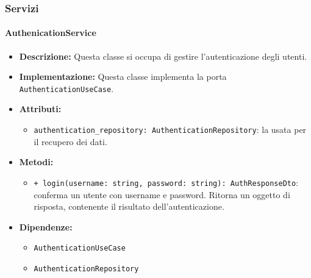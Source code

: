 \subsubsection{Servizi}

\paragraph{AuthenicationService} \label{AuthenticationService}
\begin{itemize}
    \item \textbf{Descrizione:} Questa classe si occupa di gestire l'autenticazione degli utenti.
    \item \textbf{Implementazione:} Questa classe implementa la porta \texttt{AuthenticationUseCase}.
    \item \textbf{Attributi:}
    \begin{itemize}
        \item \texttt{authentication\_repository: AuthenticationRepository}: la  usata per il recupero dei dati.
    \end{itemize}
    \item \textbf{Metodi:}
    \begin{itemize}
        \item \texttt{+ login(username: string, password: string): AuthResponseDto}: conferma un utente con username e password. Ritorna un oggetto di risposta, contenente il risultato dell'autenticazione.
    \end{itemize}
    \item \textbf{Dipendenze:}
    \begin{itemize}
        \item \texttt{AuthenticationUseCase}
        \item \texttt{AuthenticationRepository}
    \end{itemize}
\end{itemize}  

